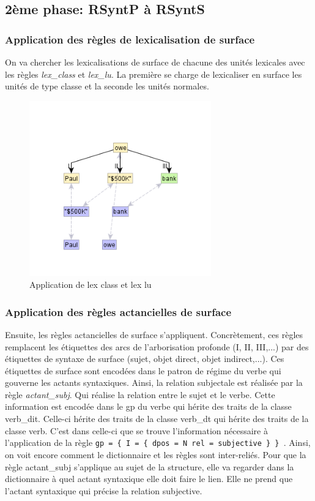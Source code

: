\subsection{2ème phase: RSyntP à RSyntS}

\subsubsection{Application des règles de lexicalisation de surface}
On va chercher les lexicalisations de surface de chacune des unités lexicales avec les règles \emph{lex\_class} et \emph{lex\_lu}. La première se charge de lexicaliser en surface les unités de type classe et la seconde les unités normales.
\begin{figure}[htb]
	\centering
	\includegraphics[width=0.7\textwidth, trim = {0cm 0cm 0cm 0cm},clip]{ch3/figs/rsyntslexicalisation1.png}
	\caption{Application de lex class et lex lu}
	\label{fig:lexsurf}
\end{figure}

\subsubsection{Application des règles actancielles de surface}
Ensuite, les règles actancielles de surface s'appliquent. Concrètement, ces règles remplacent les étiquettes des arcs de l'arborisation profonde (I, II, III,...) par des étiquettes de syntaxe de surface (sujet, objet direct, objet indirect,...). Ces étiquettes de surface sont encodées dans le patron de régime du verbe qui gouverne les actants syntaxiques. Ainsi, la relation subjectale est réalisée par la règle \emph{actant\_subj}. Qui réalise la relation entre le sujet et le verbe. Cette information est encodée dans le gp du verbe  qui hérite des traits de la classe verb\_dit. Celle-ci hérite des traits de la classe verb\_dt qui hérite des traits de la classe verb. C'est dans celle-ci que se trouve l'information nécessaire à l'application de la règle \lstinline!gp = { I = { dpos = N rel = subjective } } !. Ainsi, on voit encore comment le dictionnaire et les règles sont inter-reliés. Pour que la règle actant\_subj s'applique au sujet de la structure, elle va regarder dans la dictionnaire à quel actant syntaxique elle doit faire le lien. Elle ne prend que l'actant syntaxique qui précise la relation subjective.

